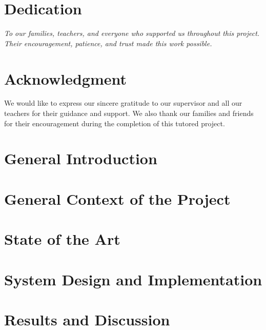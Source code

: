 \documentclass[a4paper, oneside, 12pt, final]{extreport}
\begin{document}


\chapter*{Dedication}
\thispagestyle{empty}
\begin{center}
{\it
To our families, teachers, and everyone who supported us throughout this project.\\
Their encouragement, patience, and trust made this work possible.
}
\end{center}

\chapter*{Acknowledgment}
We would like to express our sincere gratitude to our supervisor and all our teachers for their guidance and support.
We also thank our families and friends for their encouragement during the completion of this tutored project.



\tableofcontents
\listoffigures
\listoftables

\clearpage
{}

\chapter*{General Introduction}
%


\chapter{General Context of the Project}
\label{chap:chapterone}


\chapter{State of the Art}
\label{chap:2}


\chapter{System Design and Implementation}
\label{chap:3}


\chapter{Results and Discussion}
\label{chap:4}

\end{document}
